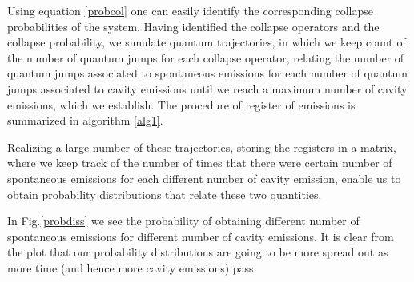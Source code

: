 \documentclass[conference]{IEEEtran}
\begin{document}
Using equation \eqref{probcol} one can easily identify the corresponding collapse probabilities of the system. Having identified the collapse operators and the collapse probability, we simulate quantum trajectories, in which we keep count of the number of quantum jumps for each collapse operator, relating the number of quantum jumps associated to spontaneous emissions for each number of quantum jumps associated to cavity emissions until we reach a maximum number of cavity emissions, which we establish. The procedure of register of emissions is summarized in algorithm \ref{alg1}. 

Realizing a large number of these trajectories, storing the registers in a matrix, where we keep track of the number of times that there were certain number of spontaneous emissions for each different number of cavity emission, enable us to obtain probability distributions that relate these two quantities.  

In Fig.\ref{probdiss} we see the probability of obtaining different number of spontaneous emissions for different number of cavity emissions. It is clear from the plot that our probability distributions are going to be more spread out as more time (and hence more cavity emissions) pass.
\end{document}
